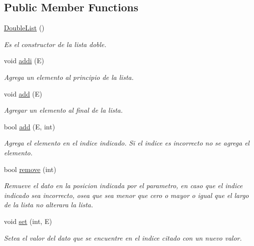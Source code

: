 \subsection*{Public Member Functions}
\begin{DoxyCompactItemize}
\item 
\hypertarget{class_double_list_ab54db9c718c7188f9413ef2b9982dd43}{\hyperlink{class_double_list_ab54db9c718c7188f9413ef2b9982dd43}{Double\-List} ()}\label{class_double_list_ab54db9c718c7188f9413ef2b9982dd43}

\begin{DoxyCompactList}\small\item\em Es el constructor de la lista doble. \end{DoxyCompactList}\item 
void \hyperlink{class_double_list_a621684e61b8d9d41cd107174d9877b1e}{addi} (E)
\begin{DoxyCompactList}\small\item\em Agrega un elemento al principio de la lista. \end{DoxyCompactList}\item 
void \hyperlink{class_double_list_adb96e6908d3d564722225b848350aa82}{add} (E)
\begin{DoxyCompactList}\small\item\em Agregar un elemento al final de la lista. \end{DoxyCompactList}\item 
bool \hyperlink{class_double_list_a84e3bb8be7d67b43dd3b63d5a47f80ed}{add} (E, int)
\begin{DoxyCompactList}\small\item\em Agrega el elemento en el indice indicado. Si el indice es incorrecto no se agrega el elemento. \end{DoxyCompactList}\item 
bool \hyperlink{class_double_list_a844c2c4c3b8260bd58ab94307359fb62}{remove} (int)
\begin{DoxyCompactList}\small\item\em Remueve el dato en la posicion indicada por el parametro, en caso que el indice indicado sea incorrecto, osea que sea menor que cero o mayor o igual que el largo de la lista no alterara la lista. \end{DoxyCompactList}\item 
void \hyperlink{class_double_list_a3c95ac3c3190b347c4a343776264bf67}{set} (int, E)
\begin{DoxyCompactList}\small\item\em Setea el valor del dato que se encuentre en el indice citado con un nuevo valor. \end{DoxyCompactList}\item 

\end{DoxyCompactItemize}

